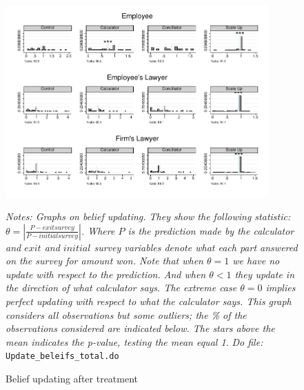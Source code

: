 \documentclass[11pt]{article}
\begin{document}
\begin{figure}[H]
    \caption{Belief updating after treatment}
    \label{Figure_updating}
     \begin{center}
        \includegraphics[width=0.9\textwidth]{updatebeleif_amount_total.pdf}
        \end{center}
     \footnotesize \textit{Notes: Graphs on belief updating. They show the following statistic: $\theta=\left|\frac{P-exitsurvey}{P-initialsurvey}\right|$. Where $P$ is the prediction made by the calculator and $exit$ and $initial$ survey variables denote what each part answered on the survey for amount won. Note that when $\theta=1$ we have no update with respect to the prediction. And when $\theta<1$ they update in the direction of what calculator says. The extreme case $\theta=0$ implies perfect updating with respect to what the calculator says. This graph considers all observations but some outliers; the \% of the observations considered are indicated below. The stars above the mean indicates the p-value, testing the mean equal 1.} 
      \footnotesize{ \textit{Do file: }  \texttt{Update\_beleifs\_total.do}}
\end{figure}
\end{document}
